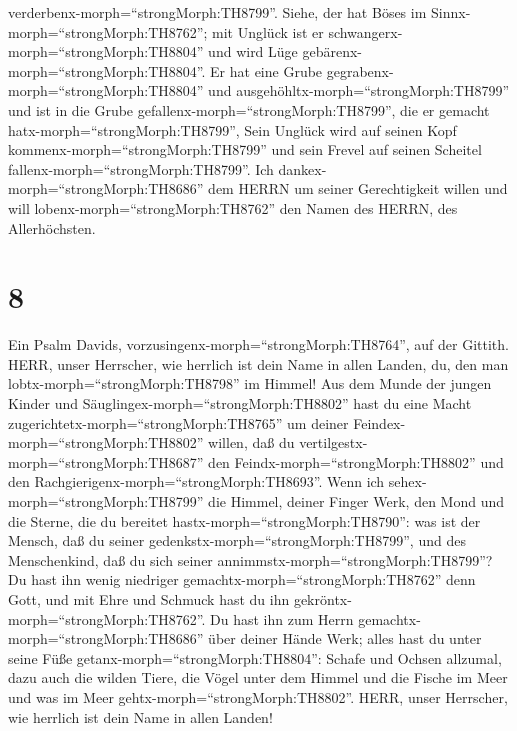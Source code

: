 verderbenx-morph=``strongMorph:TH8799''.  Siehe, der hat
Böses im Sinnx-morph=``strongMorph:TH8762''; mit Unglück ist er
schwangerx-morph=``strongMorph:TH8804'' und wird Lüge
gebärenx-morph=``strongMorph:TH8804''.  Er hat eine Grube
gegrabenx-morph=``strongMorph:TH8804'' und
ausgehöhltx-morph=``strongMorph:TH8799'' und ist in die Grube
gefallenx-morph=``strongMorph:TH8799'', die er gemacht
hatx-morph=``strongMorph:TH8799'',  Sein Unglück wird auf
seinen Kopf kommenx-morph=``strongMorph:TH8799'' und sein Frevel auf
seinen Scheitel fallenx-morph=``strongMorph:TH8799''.  Ich
dankex-morph=``strongMorph:TH8686'' dem HERRN um seiner Gerechtigkeit
willen und will lobenx-morph=``strongMorph:TH8762'' den Namen des HERRN,
des Allerhöchsten.

\hypertarget{section-7}{%
\section{8}\label{section-7}}

 Ein Psalm Davids,
vorzusingenx-morph=``strongMorph:TH8764'', auf der Gittith. HERR, unser
Herrscher, wie herrlich ist dein Name in allen Landen, du, den man
lobtx-morph=``strongMorph:TH8798'' im Himmel!  Aus dem Munde
der jungen Kinder und Säuglingex-morph=``strongMorph:TH8802'' hast du
eine Macht zugerichtetx-morph=``strongMorph:TH8765'' um deiner
Feindex-morph=``strongMorph:TH8802'' willen, daß du
vertilgestx-morph=``strongMorph:TH8687'' den
Feindx-morph=``strongMorph:TH8802'' und den
Rachgierigenx-morph=``strongMorph:TH8693''.  Wenn ich
sehex-morph=``strongMorph:TH8799'' die Himmel, deiner Finger Werk, den
Mond und die Sterne, die du bereitet hastx-morph=``strongMorph:TH8790'':
 was ist der Mensch, daß du seiner
gedenkstx-morph=``strongMorph:TH8799'', und des Menschenkind, daß du
sich seiner annimmstx-morph=``strongMorph:TH8799''?  Du hast
ihn wenig niedriger gemachtx-morph=``strongMorph:TH8762'' denn Gott, und
mit Ehre und Schmuck hast du ihn gekröntx-morph=``strongMorph:TH8762''.
 Du hast ihn zum Herrn gemachtx-morph=``strongMorph:TH8686''
über deiner Hände Werk; alles hast du unter seine Füße
getanx-morph=``strongMorph:TH8804'':  Schafe und Ochsen
allzumal, dazu auch die wilden Tiere,  die Vögel unter dem
Himmel und die Fische im Meer und was im Meer
gehtx-morph=``strongMorph:TH8802''.  HERR, unser Herrscher,
wie herrlich ist dein Name in allen Landen!

